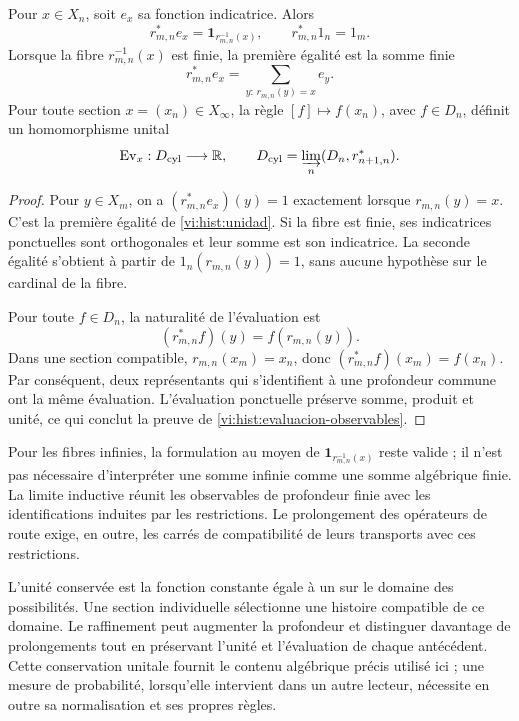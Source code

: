 \begin{lemma}
Pour \(x\in X_n\), soit \(e_x\) sa fonction indicatrice. Alors
\begin{equation}
 r_{m,n}^*e_x=\mathbf1_{r_{m,n}^{-1}(x)},\qquad
 r_{m,n}^*1_n=1_m.
 \label{vi:hist:unidad}
\end{equation}
Lorsque la fibre \(r_{m,n}^{-1}(x)\) est finie, la première égalité est
la somme finie
\[
 r_{m,n}^*e_x=\sum_{y:\,r_{m,n}(y)=x}e_y.
\]
Pour toute section \(x=(x_n)\in X_\infty\), la règle
\([f]\mapsto f(x_n)\), avec \(f\in D_n\), définit un homomorphisme
unital
\begin{equation}
 \operatorname{Ev}_x:D_{\mathrm{cyl}}\longrightarrow\mathbb R,
 \qquad
 D_{\mathrm{cyl}}=\varinjlim_n(D_n,r_{n+1,n}^*).
 \label{vi:hist:evaluacion-observables}
\end{equation}
\end{lemma}
\begin{proof}
Pour \(y\in X_m\), on a
\((r_{m,n}^*e_x)(y)=1\) exactement lorsque \(r_{m,n}(y)=x\).
C’est la première égalité de \eqref{vi:hist:unidad}. Si la fibre est
finie, ses indicatrices ponctuelles sont orthogonales et leur somme est son indicatrice.
La seconde égalité s’obtient à partir de \(1_n(r_{m,n}(y))=1\), sans aucune
hypothèse sur le cardinal de la fibre.

Pour toute \(f\in D_n\), la naturalité de l’évaluation est
\[
 (r_{m,n}^*f)(y)=f(r_{m,n}(y)).
\]
Dans une section compatible, \(r_{m,n}(x_m)=x_n\), donc
\((r_{m,n}^*f)(x_m)=f(x_n)\). Par conséquent, deux représentants qui
s’identifient à une profondeur commune ont la même évaluation.
L’évaluation ponctuelle préserve somme, produit et unité, ce qui conclut
la preuve de \eqref{vi:hist:evaluacion-observables}.
\end{proof}

Pour les fibres infinies, la formulation au moyen de
\(\mathbf1_{r_{m,n}^{-1}(x)}\) reste valide ; il n’est pas nécessaire d’interpréter une somme
infinie comme une somme algébrique finie. La limite inductive réunit les
observables de profondeur finie avec les identifications induites par
les restrictions. Le prolongement des opérateurs de route exige, en outre,
les carrés de compatibilité de leurs transports avec ces restrictions.

L’unité conservée est la fonction constante égale à un sur le domaine des
possibilités. Une section individuelle sélectionne une histoire compatible
de ce domaine. Le raffinement peut augmenter la profondeur et distinguer
davantage de prolongements tout en préservant l’unité et l’évaluation de chaque
antécédent. Cette conservation unitale fournit le contenu algébrique
précis utilisé ici ; une mesure de probabilité, lorsqu’elle intervient dans
un autre lecteur, nécessite en outre sa normalisation et ses propres règles.
